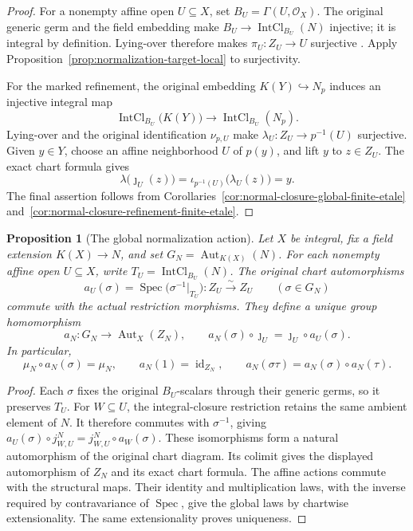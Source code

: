 \documentclass[11pt]{article}
\newtheorem{proposition}[theorem]{Proposition}
\theoremstyle{definition}
\theoremstyle{remark}
\DeclareMathOperator{\Spec}{Spec}
\begin{document}
\begin{proof}
For a nonempty affine open \(U\subseteq X\), set
\(B_U=\Gamma(U,\mathcal O_X)\). The original generic germ and the
field embedding make
\(B_U\to\operatorname{IntCl}_{B_U}(N)\) injective; it is integral
by definition. Lying-over therefore makes \(\pi_U:Z_U\to U\)
surjective \cite{StacksLyingOver}. Apply
Proposition~\ref{prop:normalization-target-local} to surjectivity.

For the marked refinement, the original embedding \(K(Y)\hookrightarrow N_p\)
induces an injective integral map
\[
 \operatorname{IntCl}_{B_U}\bigl(K(Y)\bigr)
 \longrightarrow\operatorname{IntCl}_{B_U}(N_p).
\]
Lying-over and the original identification \(\nu_{p,U}\) make
\(\lambda_U:Z_U\to p^{-1}(U)\) surjective. Given \(y\in Y\),
choose an affine neighborhood \(U\) of \(p(y)\), and lift \(y\)
to \(z\in Z_U\). The exact chart formula gives
\[
 \lambda\bigl(\jmath_U(z)\bigr)
 =\iota_{p^{-1}(U)}\bigl(\lambda_U(z)\bigr)=y.
\]
The final assertion follows from
Corollaries~\ref{cor:normal-closure-global-finite-etale}
and~\ref{cor:normal-closure-refinement-finite-etale}.
\end{proof}

\begin{proposition}[The global normalization action]
\label{prop:normalization-global-action}
Let \(X\) be integral, fix a field extension \(K(X)\to N\), and set
\(G_N=\operatorname{Aut}_{K(X)}(N)\). For each nonempty affine open
\(U\subseteq X\), write \(T_U=\operatorname{IntCl}_{B_U}(N)\).
The original chart automorphisms
\[
 a_U(\sigma)=\Spec\bigl(\sigma^{-1}|_{T_U}\bigr):Z_U\xrightarrow{\sim}Z_U
 \qquad(\sigma\in G_N)
\]
commute with the actual restriction morphisms. They define a unique
group homomorphism
\[
 a_N:G_N\longrightarrow\operatorname{Aut}_X(Z_N),\qquad
 a_N(\sigma)\circ\jmath_U=\jmath_U\circ a_U(\sigma).
\]
In particular,
\[
 \mu_N\circ a_N(\sigma)=\mu_N,\qquad
 a_N(1)=\operatorname{id}_{Z_N},\qquad
 a_N(\sigma\tau)=a_N(\sigma)\circ a_N(\tau).
\]
\end{proposition}

\begin{proof}
Each \(\sigma\) fixes the original \(B_U\)-scalars through their
generic germs, so it preserves \(T_U\). For \(W\subseteq U\),
the integral-closure restriction retains the same ambient element of
\(N\). It therefore commutes with \(\sigma^{-1}\), giving
\(a_U(\sigma)\circ j^N_{W,U}=j^N_{W,U}\circ a_W(\sigma)\).
These isomorphisms form a natural automorphism of the original chart
diagram. Its colimit gives the displayed automorphism of \(Z_N\)
and its exact chart formula. The affine actions commute with the
structural maps. Their identity and multiplication laws, with the
inverse required by contravariance of \(\Spec\), give the global
laws by chartwise extensionality. The same extensionality proves
uniqueness.
\end{proof}
\end{document}
